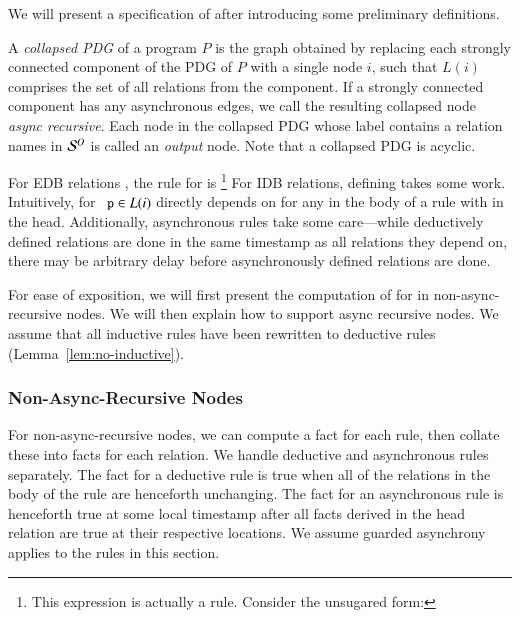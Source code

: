 We will present a specification of  after introducing some preliminary definitions.

A {\em collapsed PDG} of a \lang program $P$ is the graph obtained by replacing each strongly
connected component of the PDG of $P$ with a single node $i$, such that $L(i)$
comprises
the set of all relations from the component.  If a strongly connected
component has any asynchronous edges, we call the resulting collapsed node {\em
  async recursive}.  Each node in the collapsed PDG whose label contains a
relation names in $\oschema$ is called an {\em output} node.  Note that a
collapsed PDG is acyclic.

For EDB relations , the rule for  is \footnote{This expression is actually a rule.  Consider the unsugared form: }  For
IDB relations, defining  takes some work.  Intuitively,
 for $\dedalus{p} \in L(i)$ directly depends on
 for any  in the body of a rule with  in
the head.  Additionally, asynchronous rules take some care---while deductively
defined relations are done in the same timestamp as all relations they depend
on, there may be arbitrary delay before asynchronously defined relations are done.

For ease of exposition, we will first present the computation of  for  in non-async-recursive nodes.  We will then explain how to support async recursive nodes.  We assume that all inductive rules have been rewritten to deductive rules (Lemma~\ref{lem:no-inductive}).

\subsubsection{Non-Async-Recursive Nodes}
\label{sec:nonasyncrecursive}

For non-async-recursive nodes, we can compute a  fact for each
rule, then collate these into  facts for each relation.  We
handle deductive and asynchronous rules separately. The  fact for a deductive rule is true when all of the relations in the body of the
rule are henceforth unchanging. The  fact for an asynchronous rule is henceforth true at some local timestamp after all facts derived in the head relation are true at their respective locations.   We assume guarded asynchrony applies to
the rules in this section.

